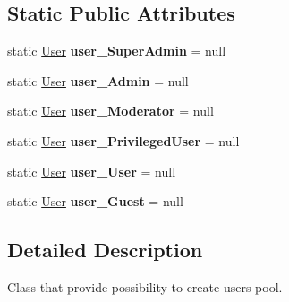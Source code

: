 \subsection*{Static Public Attributes}
\begin{DoxyCompactItemize}
\item 
\mbox{\label{class_a_c_tests_1_1_helpers_1_1_users_ae7a31e68b969365b2bd258a8406bd49a}} 
static \mbox{\hyperlink{class_authority_controller_1_1_data_1_1_personal_1_1_user}{User}} {\bfseries user\+\_\+\+Super\+Admin} = null
\item 
\mbox{\label{class_a_c_tests_1_1_helpers_1_1_users_ab76d942e840e41194bbe8a7963a6b120}} 
static \mbox{\hyperlink{class_authority_controller_1_1_data_1_1_personal_1_1_user}{User}} {\bfseries user\+\_\+\+Admin} = null
\item 
\mbox{\label{class_a_c_tests_1_1_helpers_1_1_users_a3b31b19e7d79f19f27dcc845949e9bad}} 
static \mbox{\hyperlink{class_authority_controller_1_1_data_1_1_personal_1_1_user}{User}} {\bfseries user\+\_\+\+Moderator} = null
\item 
\mbox{\label{class_a_c_tests_1_1_helpers_1_1_users_a732201ff6335b1e9d944451ab8abed45}} 
static \mbox{\hyperlink{class_authority_controller_1_1_data_1_1_personal_1_1_user}{User}} {\bfseries user\+\_\+\+Privileged\+User} = null
\item 
\mbox{\label{class_a_c_tests_1_1_helpers_1_1_users_ac2f17280b3cc582e5636be28a928f750}} 
static \mbox{\hyperlink{class_authority_controller_1_1_data_1_1_personal_1_1_user}{User}} {\bfseries user\+\_\+\+User} = null
\item 
\mbox{\label{class_a_c_tests_1_1_helpers_1_1_users_aed177a15bf5ed34c895cac91f795910f}} 
static \mbox{\hyperlink{class_authority_controller_1_1_data_1_1_personal_1_1_user}{User}} {\bfseries user\+\_\+\+Guest} = null
\end{DoxyCompactItemize}


\subsection{Detailed Description}
Class that provide possibility to create users pool. 



